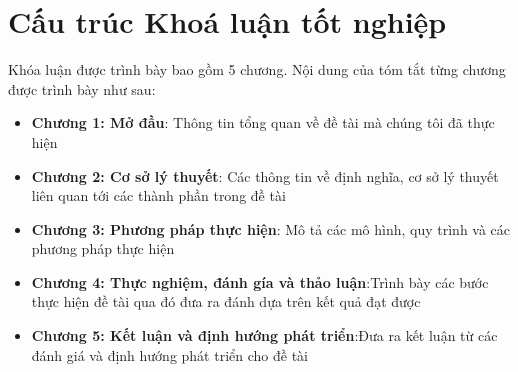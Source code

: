\section{Cấu trúc Khoá luận tốt nghiệp}
\label{sec:CauTruc}
Khóa luận được trình bày bao gồm 5 chương. Nội dung của tóm tắt từng chương được trình bày như sau:
\begin{itemize}
    \item \textbf{Chương 1: Mở đầu}: Thông tin tổng quan về đề tài mà chúng tôi đã thực hiện
    \item \textbf{Chương 2: Cơ sở lý thuyết}: Các thông tin về định nghĩa, cơ sở lý thuyết liên quan tới các thành phần trong đề tài
    \item \textbf{Chương 3: Phương pháp thực hiện}: Mô tả các mô hình, quy trình và các phương pháp thực hiện
    \item \textbf{Chương 4: Thực nghiệm, đánh gía và thảo luận}:Trình bày các bước thực hiện đề tài qua đó đưa ra đánh dựa trên kết quả đạt được 
    \item \textbf{Chương 5: Kết luận và định hướng phát triển}:Đưa ra kết luận từ các đánh giá và định hướng phát triển cho đề tài
\end{itemize}